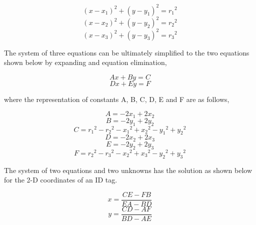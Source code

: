 \begin{equation*}
	(x-x_1)^2 + (y-y_1)^2 = {r_1}^2 
\end{equation*}
\begin{equation*}
	(x-x_2)^2 + (y-y_2)^2 = {r_2}^2 
\end{equation*}
\begin{equation*}
	(x-x_3)^2 + (y-y_3)^2 = {r_3}^2  
\end{equation*}

\pagebreak
The system of three equations can be ultimately simplified to the two equations shown below by expanding and equation elimination,

\begin{equation*}
	Ax + By = C
\end{equation*}
\begin{equation*}
	Dx + Ey = F
\end{equation*}

\medskip
where the representation of constants A, B, C, D, E and F are as follows,

\begin{equation*}
	A = -2x_1 + 2x_2
\end{equation*}
\begin{equation*}
	B = -2y_1 + 2y_2
\end{equation*}
\begin{equation*}
	C = {r_1}^2 - {r_2}^2 - {x_1}^2 + {x_2}^2 - {y_1}^2 + {y_2}^2
\end{equation*}
\begin{equation*}
	D = -2x_2 + 2x_3
\end{equation*}
\begin{equation*}
	E = -2y_2 + 2y_3
\end{equation*}
\begin{equation*}
	F = {r_2}^2 - {r_3}^2 - {x_2}^2 + {x_3}^2 - {y_2}^2 + {y_3}^2
\end{equation*}

\medskip
The system of two equations and two unknowns has the solution as shown below for the 2-D coordinates of an ID tag.

\begin{equation*}
	x = \frac{CE - FB} {EA - BD}
\end{equation*}
\begin{equation*}
	y = \frac{CD - AF} {BD - AE}
\end{equation*}


\pagebreak
